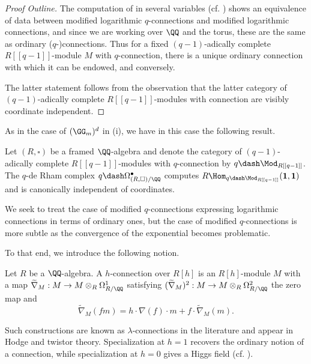 \begin{proof}[Proof Outline]
    The computation of  in several variables (cf. \cite[Lem. 4.1]{qDeformations}) shows an equivalence of data between modified logarithmic $q$-connections and modified logarithmic connections, and since we are working over $\QQ$ and the torus, these are the same as ordinary ($q$-)connections. Thus for a fixed $(q-1)$-adically complete $R[[q-1]]$-module $M$ with $q$-connection, there is a unique ordinary connection with which it can be endowed, and conversely.
    
    The latter statement follows from the observation that the latter category of $(q-1)$-adically complete $R[[q-1]]$-modules with connection are visibly coordinate independent. 
\end{proof}
As in the case of $(\GG_{m})^{d}$ in  (i), we have in this case the following result. 
\begin{corollary}\label{corr: modules with q-connection are coordinate independent}
    Let $(R,\square)$ be a framed $\QQ$-algebra and denote the category of $(q-1)$-adically complete $R[[q-1]]$-modules with $q$-connection by $q\dash\Mod_{R[[q-1]]}$. The $q$-de Rham complex $q\dash\Omega_{(R,\square)/\QQ}^{\bullet}$ computes $R\Hom_{q\dash\Mod_{R[[q-1]]}}(\mathbf{1},\mathbf{1})$ and is canonically independent of coordinates.
\end{corollary}
We seek to treat the case of modified $q$-connections expressing logarithmic connections in terms of ordinary ones, but the case of modified $q$-connections is more subtle as the convergence of the exponential becomes problematic. 

To that end, we introduce the following notion. 
\begin{definition}[$h$-Connections]\label{def: h-connection}
    Let $R$ be a $\QQ$-algebra. A $h$-connection over $R[h]$ is an $R[h]$-module $M$ with a map $\widetilde{\nabla}_{M}:M\to M\otimes_{R}\Omega^{1}_{R/\QQ}$ satisfying $(\widetilde{\nabla}_{M})^{2}:M\to M\otimes_{R}\Omega^{2}_{R/\QQ}$ the zero map and 
    $$\widetilde{\nabla}_{M}(fm)=h\cdot\nabla(f)\cdot m+f\cdot\widetilde{\nabla}_{M}(m).$$
\end{definition}
\begin{remark}
    Such constructions are known as $\lambda$-connections in the literature and appear in Hodge and twistor theory. Specialization at $h=1$ recovers the ordinary notion of a connection, while specialization at $h=0$ gives a Higgs field (cf. \cite[\S 2.3]{MorrowTsuji}). 
\end{remark} 

